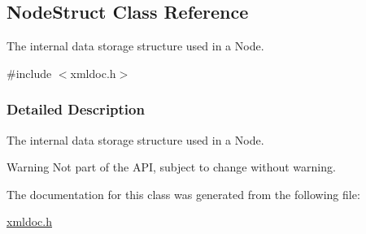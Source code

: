 \hypertarget{classNodeStruct}{
\subsection{NodeStruct Class Reference}
\label{d4/d18/classNodeStruct}
}


The internal data storage structure used in a Node.  




{\ttfamily \#include $<$xmldoc.h$>$}



\subsubsection{Detailed Description}
The internal data storage structure used in a Node. \begin{DoxyWarning}{Warning}
Not part of the API, subject to change without warning. 
\end{DoxyWarning}


The documentation for this class was generated from the following file:\begin{DoxyCompactItemize}
\item 
\hyperlink{xmldoc_8h}{xmldoc.h}\end{DoxyCompactItemize}
